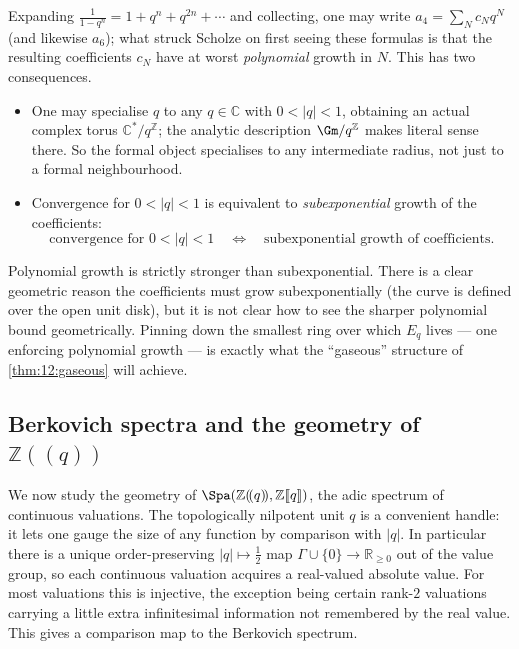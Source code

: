 \begin{remark}
\label{rmk:12:polynomial-growth}
Expanding $\tfrac{1}{1-q^{n}}=1+q^{n}+q^{2n}+\cdots$ and collecting, one may
write $a_{4}=\sum_{N} c_{N}q^{N}$ (and likewise $a_6$); what struck Scholze on
first seeing these formulas is that the resulting coefficients $c_N$ have at
worst \emph{polynomial} growth in $N$. This has two consequences.
\begin{itemize}
\item One may specialise $q$ to any $q\in\mathbb{C}$ with $0<|q|<1$, obtaining an
actual complex torus $\mathbb{C}^{\ast}/q^{\mathbb{Z}}$; the analytic description
$\Gm/q^{\mathbb{Z}}$ makes literal sense there. So the formal object
specialises to any intermediate radius, not just to a formal neighbourhood.
\item Convergence for $0<|q|<1$ is equivalent to \emph{subexponential} growth of
the coefficients:
\begin{equation*}
\text{convergence for } 0<|q|<1\quad\Longleftrightarrow\quad
\text{subexponential growth of coefficients.}
\end{equation*}
\end{itemize}
Polynomial growth is strictly stronger than subexponential. There is a clear
geometric reason the coefficients must grow subexponentially (the curve is
defined over the open unit disk), but it is not clear how to see the sharper
polynomial bound geometrically. Pinning down the smallest ring over which $E_q$
lives --- one enforcing polynomial growth --- is exactly what the ``gaseous''
structure of \cref{thm:12:gaseous} will achieve.
\end{remark}

\subsection{Berkovich spectra and the geometry of \texorpdfstring{$\mathbb{Z}(\!(q)\!)$}{Z((q))}}

We now study the geometry of $\Spa(\mathbb{Z}(\!(q)\!),\mathbb{Z}[\![q]\!])$,
the adic spectrum of continuous valuations. The topologically nilpotent unit
$q$ is a convenient handle: it lets one gauge the size of any function by
comparison with $|q|$. In particular there is a unique order-preserving
$|q|\mapsto\tfrac12$ map $\Gamma\cup\{0\}\to\mathbb{R}_{\ge0}$ out of the value
group, so each continuous valuation acquires a real-valued absolute value. For
most valuations this is injective, the exception being certain rank-$2$
valuations carrying a little extra infinitesimal information not remembered by
the real value. This gives a comparison map to the Berkovich spectrum.

